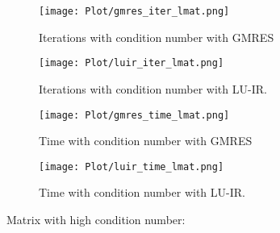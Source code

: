\begin{figure}[ht]
     \begin{minipage}[b]{0.5\linewidth}
        \centering
   \texttt{[image: Plot/gmres\_iter\_lmat.png]}
        \caption{Iterations with condition number with GMRES}
        \label{fig:image9}
    \end{minipage}
    \hspace{0.5cm} 
    \begin{minipage}[b]{0.5\linewidth}
        \centering
        \texttt{[image: Plot/luir\_iter\_lmat.png]}
        \caption{Iterations with condition number with LU-IR.}
        \label{fig:image10}
    \end{minipage}
\end{figure}
\newpage
\begin{figure}[ht]
     \begin{minipage}[b]{0.5\linewidth}
        \centering
   \texttt{[image: Plot/gmres\_time\_lmat.png]}
        \caption{Time with condition number with GMRES}
        \label{fig:image11}
    \end{minipage}
    \hspace{0.5cm} 
    \begin{minipage}[b]{0.5\linewidth}
        \centering
        \texttt{[image: Plot/luir\_time\_lmat.png]}
        \caption{Time with condition number with LU-IR.}
        \label{fig:image12}
    \end{minipage}
\end{figure}
\clearpage
\newpage
Matrix with high condition number:
